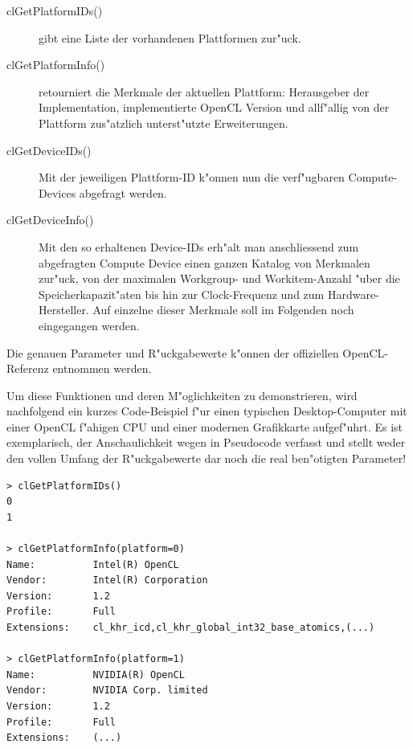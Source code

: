 \begin{refsection}
\begin{description}
 \item [clGetPlatformIDs()] gibt eine Liste der vorhandenen Plattformen zur"uck.
 \item [clGetPlatformInfo()] retourniert die Merkmale der aktuellen Plattform:
                            Herausgeber der Implementation, implementierte 
                            OpenCL Version und allf"allig von der Plattform 
                            zus"atzlich unterst"utzte Erweiterungen.
 \item [clGetDeviceIDs()]   Mit der jeweiligen Plattform-ID k"onnen nun die
                            verf"ugbaren Compute-Devices abgefragt werden.
 \item [clGetDeviceInfo()]  Mit den so erhaltenen Device-IDs erh"alt man anschliessend 
                            zum abgefragten Compute Device einen ganzen Katalog von
                            Merkmalen zur"uck, von der maximalen
                            Workgroup- und Workitem-Anzahl "uber die
                            Speicherkapazit"aten bis hin zur
                            Clock-Frequenz und zum Hardware-Hersteller. Auf einzelne
                            dieser Merkmale soll im Folgenden noch eingegangen werden.
\end{description}

\noindent Die genauen Parameter und R"uckgabewerte k"onnen der offiziellen
OpenCL-Referenz\cite{crypto:opencl_ref} entnommen werden.

Um diese Funktionen und deren M"oglichkeiten zu demonstrieren, wird nachfolgend ein kurzes
Code-Beispiel f"ur einen typischen Desktop-Computer mit einer OpenCL f"ahigen
CPU und einer modernen Grafikkarte aufgef"uhrt. Es ist exemplarisch, der
Anschaulichkeit wegen in Pseudocode verfasst und stellt weder den vollen
Umfang der R"uckgabewerte dar noch die real ben"otigten Parameter!

\begin{small}
\begin{verbatim}
> clGetPlatformIDs()
0
1

> clGetPlatformInfo(platform=0)
Name:          Intel(R) OpenCL
Vendor:        Intel(R) Corporation
Version:       1.2
Profile:       Full
Extensions:    cl_khr_icd,cl_khr_global_int32_base_atomics,(...)

> clGetPlatformInfo(platform=1)
Name:          NVIDIA(R) OpenCL
Vendor:        NVIDIA Corp. limited
Version:       1.2
Profile:       Full
Extensions:    (...)


\end{verbatim}
\end{small}
\end{refsection}
